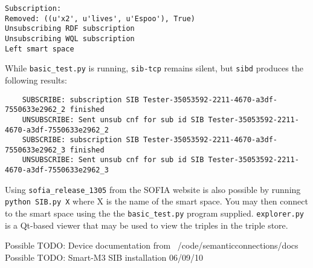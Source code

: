 \begin{verbatim}
Subscription:
Removed: ((u'x2', u'lives', u'Espoo'), True)
Unsubscribing RDF subscription
Unsubscribing WQL subscription
Left smart space
\end{verbatim}

While \texttt{basic\_test.py} is running, \texttt{sib-tcp} remains silent, but \texttt{sibd} produces the following results:

\begin{verbatim}
	SUBSCRIBE: subscription SIB Tester-35053592-2211-4670-a3df-7550633e2962_2 finished
	UNSUBSCRIBE: Sent unsub cnf for sub id SIB Tester-35053592-2211-4670-a3df-7550633e2962_2
	SUBSCRIBE: subscription SIB Tester-35053592-2211-4670-a3df-7550633e2962_3 finished
	UNSUBSCRIBE: Sent unsub cnf for sub id SIB Tester-35053592-2211-4670-a3df-7550633e2962_3
\end{verbatim}

Using \texttt{sofia\_release\_1305} from the SOFIA website is also possible by running \verb|python SIB.py X| where X is the name of the smart space. You may then connect to the smart space using the the \texttt{basic\_test.py} program supplied.
\texttt{explorer.py} is a Qt-based viewer that may be used to view the triples in the triple store.

Possible TODO: Device documentation from ~/code/semanticconnections/docs
Possible TODO: Smart-M3 SIB installation 06/09/10